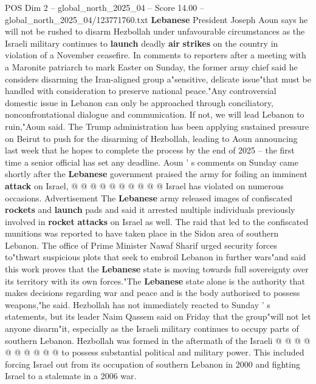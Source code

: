 \begin{textsample}{POS Dim 2 – global\_north\_2025\_04 – Score 14.00 – global\_north\_2025\_04/123771760.txt}  \label{ex:f2_pos_428}
\textbf{Lebanese} President Joseph Aoun says he will not be rushed to disarm Hezbollah under unfavourable circumstances as the Israeli military continues to \textbf{launch} deadly \textbf{air} \textbf{strikes} on the country in violation of a November ceasefire.
In comments to reporters after a meeting with a Maronite patriarch to mark Easter on Sunday, the former army chief said he considers disarming the Iran-aligned group a"sensitive, delicate issue"that must be handled with consideration to preserve national peace."Any controversial domestic issue in Lebanon can only be approached through conciliatory, nonconfrontational dialogue and communication.
If not, we will lead Lebanon to ruin,"Aoun said.
The Trump administration has been applying sustained pressure on Beirut to push for the disarming of Hezbollah, leading to Aoun announcing last week that he hopes to complete the process by the end of 2025 -- the first time a senior official has set any deadline.
Aoun ' s comments on Sunday came shortly after the \textbf{Lebanese} government praised the army for foiling an imminent \textbf{attack} on Israel, @ @ @ @ @ @ @ @ @ @ Israel has violated on numerous occasions.
Advertisement The \textbf{Lebanese} army released images of confiscated \textbf{rockets} and \textbf{launch} pads and said it arrested multiple individuals previously involved in \textbf{rocket} \textbf{attacks} on Israel as well.
The raid that led to the confiscated munitions was reported to have taken place in the Sidon area of southern Lebanon.
The office of Prime Minister Nawaf Sharif urged security forces to"thwart suspicious plots that seek to embroil Lebanon in further wars"and said this work proves that the \textbf{Lebanese} state is moving towards full sovereignty over its territory with its own forces."The \textbf{Lebanese} state alone is the authority that makes decisions regarding war and peace and is the body authorised to possess weapons,"he said.
Hezbollah has not immediately reacted to Sunday ' s statements, but its leader Naim Qassem said on Friday that the group"will not let anyone disarm"it, especially as the Israeli military continues to occupy parts of southern Lebanon.
Hezbollah was formed in the aftermath of the Israeli @ @ @ @ @ @ @ @ @ @ to possess substantial political and military power.
This included forcing Israel out from its occupation of southern Lebanon in 2000 and fighting Israel to a stalemate in a 2006 war.

\end{textsample}
